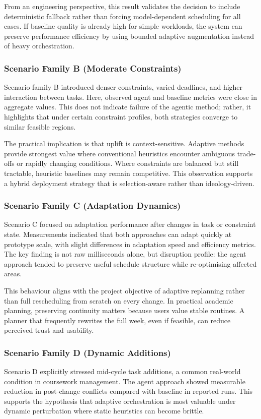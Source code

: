 \documentclass[12pt]{article}
\begin{document}
From an engineering perspective, this result validates the decision to include deterministic fallback rather than forcing model-dependent scheduling for all cases. If baseline quality is already high for simple workloads, the system can preserve performance efficiency by using bounded adaptive augmentation instead of heavy orchestration.

\subsubsection{Scenario Family B (Moderate Constraints)}
Scenario family B introduced denser constraints, varied deadlines, and higher interaction between tasks. Here, observed agent and baseline metrics were close in aggregate values. This does not indicate failure of the agentic method; rather, it highlights that under certain constraint profiles, both strategies converge to similar feasible regions.

The practical implication is that uplift is context-sensitive. Adaptive methods provide strongest value where conventional heuristics encounter ambiguous trade-offs or rapidly changing conditions. Where constraints are balanced but still tractable, heuristic baselines may remain competitive. This observation supports a hybrid deployment strategy that is selection-aware rather than ideology-driven.

\subsubsection{Scenario Family C (Adaptation Dynamics)}
Scenario C focused on adaptation performance after changes in task or constraint state. Measurements indicated that both approaches can adapt quickly at prototype scale, with slight differences in adaptation speed and efficiency metrics. The key finding is not raw milliseconds alone, but disruption profile: the agent approach tended to preserve useful schedule structure while re-optimising affected areas.

This behaviour aligns with the project objective of adaptive replanning rather than full rescheduling from scratch on every change. In practical academic planning, preserving continuity matters because users value stable routines. A planner that frequently rewrites the full week, even if feasible, can reduce perceived trust and usability.

\subsubsection{Scenario Family D (Dynamic Additions)}
Scenario D explicitly stressed mid-cycle task additions, a common real-world condition in coursework management. The agent approach showed measurable reduction in post-change conflicts compared with baseline in reported runs. This supports the hypothesis that adaptive orchestration is most valuable under dynamic perturbation where static heuristics can become brittle.
\end{document}
